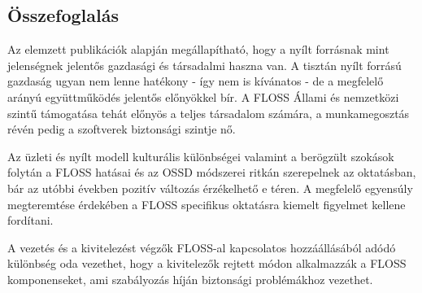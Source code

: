 \documentclass[12pt,magyar,a4paper,oneside]{scrreprt}
\begin{document}
\hypertarget{uxf6sszefoglaluxe1s-1}{%
\subsection{Összefoglalás}\label{uxf6sszefoglaluxe1s-1}}

Az elemzett publikációk alapján megállapítható, hogy a nyílt forrásnak
mint jelenségnek jelentős gazdasági és társadalmi haszna van. A tisztán
nyílt forrású gazdaság ugyan nem lenne hatékony - így nem is kívánatos -
de a megfelelő arányú együttműködés jelentős előnyökkel bír. A FLOSS
Állami és nemzetközi szintű támogatása tehát előnyös a teljes társadalom
számára, a munkamegosztás révén pedig a szoftverek biztonsági szintje
nő.

Az üzleti és nyílt modell kulturális különbségei valamint a berögzült
szokások folytán a FLOSS hatásai és az OSSD módszerei ritkán szerepelnek
az oktatásban, bár az utóbbi években pozitív változás érzékelhető e
téren. A megfelelő egyensúly megteremtése érdekében a FLOSS specifikus
oktatásra kiemelt figyelmet kellene fordítani.

A vezetés és a kivitelezést végzők FLOSS-al kapcsolatos hozzáállásából
adódó különbség oda vezethet, hogy a kivitelezők rejtett módon
alkalmazzák a FLOSS komponenseket, ami szabályozás híján biztonsági
problémákhoz vezethet.
\end{document}
